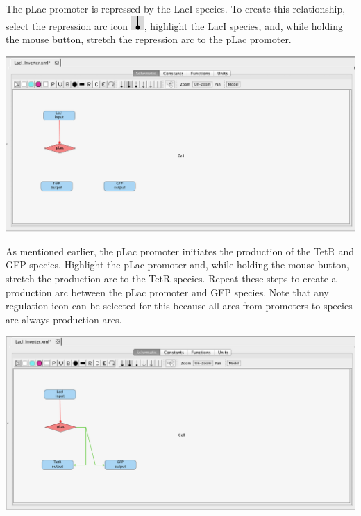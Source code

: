 \documentclass[titlepage,11pt]{article}
\begin{document}
The pLac promoter is repressed by the LacI species.  To create this relationship, select the repression arc icon 
\includegraphics{../gui/icons/modelview/inhibition_selected}, highlight the LacI species, and, while holding the mouse button, stretch the repression arc to the pLac promoter.  

\begin{center}
\includegraphics[width=160mm]{screenshots/repressionGT} 
\end{center}

As mentioned earlier, the pLac promoter initiates the production of the TetR and GFP species.  Highlight the pLac promoter and, while holding the mouse button, stretch the production arc to the TetR species.  Repeat these steps to create a production arc between the pLac promoter and GFP species.  Note that any regulation icon can be selected for this because all arcs from promoters to species are always production arcs.  

\begin{center}
\includegraphics[width=160mm]{screenshots/productionGT}
\end{center}
\end{document}
